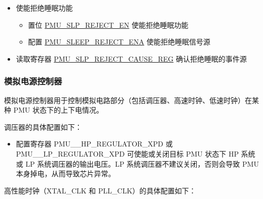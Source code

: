 \documentclass[main\_\_CN.tex]{subfiles}
\begin{document}
\begin{itemize}
    \item  使能拒绝睡眠功能
        \begin{itemize}
            \item 置位 \hyperref[fielddesc:PMUSLPREJECTEN]{PMU\_SLP\_REJECT\_EN} 使能拒绝睡眠功能
            \item 配置 \hyperref[fielddesc:PMUSLEEPREJECTENA]{PMU\_SLEEP\_REJECT\_ENA} 使能拒绝睡眠信号源
        \end{itemize}
    \item 读取寄存器 \hyperref[fielddesc:PMUREJECTCAUSE]{PMU\_SLP\_REJECT\_CAUSE\_REG} 确认拒绝睡眠的事件源
\end{itemize}

\subsubsection{模拟电源控制器}\label{sec:pmu_analog_power_controller}

模拟电源控制器用于控制模拟电路部分（包括调压器、高速时钟、低速时钟）在某种 PMU 状态下的上下电情况。

调压器的具体配置如下：

\begin{itemize}
    \item 配置寄存器 PMU\_\_HP\_REGULATOR\_XPD 或PMU\_\_LP\_REGULATOR\_XPD 可使能或关闭目标 PMU 状态下 HP 系统或 LP 系统调压器的输出电压。LP 系统调压器不建议关闭，否则会导致 PMU 本身掉电，从而导致芯片异常。
\end{itemize}

高性能时钟（XTAL\_CLK 和 PLL\_CLK）的具体配置如下：
\end{document}
